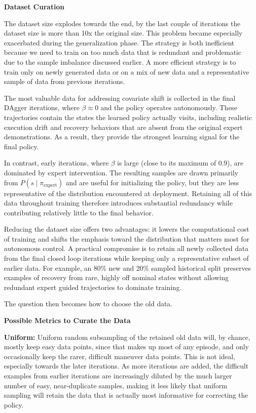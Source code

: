 \noindent\textbf{Dataset Curation}

The dataset size explodes towards the end, by the last couple of
iterations the dataset size is more than 10x the original size. This
problem became especially exacerbated during the generalization phase.
The strategy is both inefficient because we need to train on too much
data that is redundant and problematic due to the sample imbalance
discussed earlier. A more efficient strategy is to train only on newly
generated data or on a mix of new data and a representative sample of
data from previous iterations.

The most valuable data for addressing covariate shift is collected in
the final DAgger iterations, where $\beta \approx 0$ and the policy
operates autonomously. These trajectories contain the states the learned
policy actually visits, including realistic execution drift and
recovery behaviors that are absent from the original expert
demonstrations. As a result, they provide the strongest learning signal
for the final policy.

In contrast, early iterations, where $\beta$ is large (close to its
maximum of $0.9$), are dominated by
expert intervention. The resulting samples are drawn primarily from
$P(s \mid \pi_{\text{expert}})$ and are useful for initializing the
policy, but they are less representative of the distribution
encountered at deployment. Retaining all of this data throughout
training therefore introduces substantial redundancy while contributing
relatively little to the final behavior.

Reducing the dataset size offers two advantages: it lowers the
computational cost of training and shifts the emphasis toward the
distribution that matters most for autonomous control. A practical
compromise is to retain all newly collected data from the final closed
loop iterations while keeping only a representative subset of earlier
data. For example, an 80\% new and 20\% sampled historical split
preserves examples of recovery from rare, highly off nominal states
without allowing redundant expert guided trajectories to dominate
training.

The question then becomes how to choose the old data.

\noindent\textbf{Possible Metrics to Curate the Data}


\textbf{Uniform:} Uniform random subsampling of the retained old data will,
by chance, mostly keep easy data points, since that makes up most of any
episode, and only occasionally keep the rarer, difficult maneuver data
points. This is not ideal, especially towards the later iterations. As
more iterations are added, the difficult examples from earlier
iterations are increasingly diluted by the much larger number of easy,
near-duplicate samples, making it less likely that uniform sampling will
retain the data that is actually most informative for correcting the
policy.

